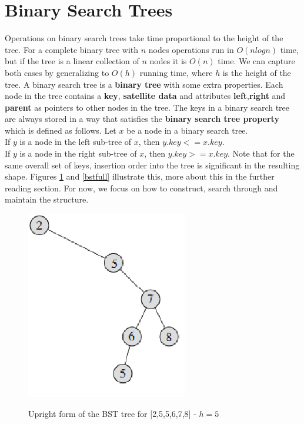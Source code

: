 \documentclass[10pt,a4paper]{article}
\begin{document}
\section{Binary Search Trees}
Operations on binary search trees take time proportional to the height of the tree. For a complete binary tree with $n$ nodes operations run in $O(n log n)$ time, but if the tree is a linear collection of $n$ nodes it is $O(n)$ time. We can capture both cases by generalizing to $O(h)$ running time, where $h$ is the height of the tree. 
\newline\newline
A binary search tree is a {\bf binary tree} with some extra properties. Each node in the tree contains a {\bf key}, {\bf satellite data} and attributes {\bf left},{\bf right} and {\bf parent} as pointers to other nodes in the tree. The keys in a binary search tree are always stored in a way that satisfies the {\bf binary search tree property} which is defined as follows.
\newline\newline
Let $x$ be a node in a binary search tree. \\
If $y$ is a node in the left sub-tree of $x$, then $y.key <= x.key$. \\
If $y$ is a node in the right sub-tree of $x$, then $y.key>=x.key$.
\newline\newline
Note that for the same overall set of keys, insertion order into the tree is significant in the resulting shape. Figures \ref{bstupright} and \ref{bstfull} illustrate this, more about this in the further reading section. For now, we focus on how to construct, search through and maintain the structure. 

\begin{figure}
\caption{Upright form of the BST tree for {[2,5,5,6,7,8]} - $h=5$ }
\begin{center}
\includegraphics[scale=0.43]{../images/bstupright.png}
\label{bstupright}
\end{center}
\end{figure}
\end{document}
